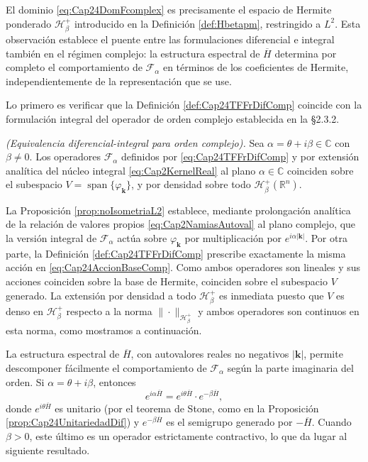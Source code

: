             El dominio \eqref{eq:Cap24DomFcomplex} es precisamente el espacio de Hermite ponderado $\mathcal{H}_\beta^+$ introducido en la Definición \ref{def:Hbetapm}, restringido a $L^2$. Esta observación establece el puente entre las formulaciones diferencial e integral también en el régimen complejo: la estructura espectral de $\overline{H}$ determina por completo el comportamiento de $\mathcal{F}_\alpha$ en términos de los coeficientes de Hermite, independientemente de la representación que se use.

            Lo primero es verificar que la Definición \ref{def:Cap24TFFrDifComp} coincide con la formulación integral del operador de orden complejo establecida en la §2.3.2.

            \begin{proposition}\label{prop:Cap24EquivDifIntComp}
                \textit{(Equivalencia diferencial-integral para orden complejo).} Sea $\alpha = \theta + i\beta \in \mathbb{C}$ con $\beta \neq 0$. Los operadores $\mathcal{F}_\alpha$ definidos por \eqref{eq:Cap24TFFrDifComp} y por extensión analítica del núcleo integral \eqref{eq:Cap2KernelReal} al plano $\alpha\in\mathbb{C}$ coinciden sobre el subespacio $V = \operatorname{span}\{\varphi_{\boldsymbol{k}}\}$, y por densidad sobre todo $\mathcal{H}_\beta^+(\mathbb{R}^n)$.
            \end{proposition}
            \begin{Proof}
                La Proposición \ref{prop:noIsometriaL2} establece, mediante prolongación analítica de la relación de valores propios \eqref{eq:Cap2NamiasAutoval} al plano complejo, que la versión integral de $\mathcal{F}_\alpha$ actúa sobre $\varphi_{\boldsymbol{k}}$ por multiplicación por $e^{i\alpha|\boldsymbol{k}|}$. Por otra parte, la Definición \ref{def:Cap24TFFrDifComp} prescribe exactamente la misma acción en \eqref{eq:Cap24AccionBaseComp}. Como ambos operadores son lineales y sus acciones coinciden sobre la base de Hermite, coinciden sobre el subespacio $V$ generado. La extensión por densidad a todo $\mathcal{H}_\beta^+$ es inmediata puesto que $V$ es denso en $\mathcal{H}_\beta^+$ respecto a la norma $\|\cdot\|_{\mathcal{H}_\beta^+}$ y ambos operadores son continuos en esta norma, como mostramos a continuación.
            \end{Proof}

            La estructura espectral de $\overline{H}$, con autovalores reales no negativos $|\boldsymbol{k}|$, permite descomponer fácilmente el comportamiento de $\mathcal{F}_\alpha$ según la parte imaginaria del orden. Si $\alpha = \theta + i\beta$, entonces
            \begin{equation*}
                e^{i\alpha \overline{H}} = e^{i\theta \overline{H}} \cdot e^{-\beta \overline{H}},
            \end{equation*}
            donde $e^{i\theta \overline{H}}$ es unitario (por el teorema de Stone, como en la Proposición \ref{prop:Cap24UnitariedadDif}) y $e^{-\beta \overline{H}}$ es el semigrupo generado por $-\overline{H}$. Cuando $\beta > 0$, este último es un operador estrictamente contractivo, lo que da lugar al siguiente resultado.

